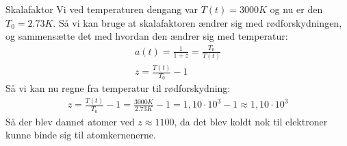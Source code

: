 \begin{opgave}{Skalafaktor}
	Vi ved temperaturen dengang var $T(t) = 3000 K$ og nu er den $T_0 = 2.73 K$. Så vi kan bruge at skalafaktoren ændrer sig med rødforskydningen, og sammensætte det med hvordan den ændrer sig med temperatur:
	\begin{align}
	    a(t) = \frac{1}{1+z} = \frac{T_0}{T(t)}\\
	    z = \frac{T(t)}{T_0} - 1
	\end{align}{}
	Så vi kan nu regne fra temperatur til rødforskydning:
	\begin{align}
	    z = \frac{T(t)}{T_0} - 1 = \frac{3000 K}{2.73 K} - 1= 1,10\cdot10^3 -1 \approx 1,10\cdot10^3
	\end{align}
	Så der blev dannet atomer ved $z\approx1100$, da det blev koldt nok til elektroner kunne binde sig til atomkernenerne.
\end{opgave}

